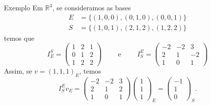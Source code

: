 \documentclass{beamer}
\begin{document}
\begin{darkframes}
\begin{frame}{Exemplo}
  Em ${\mathbb{R}}^3$, se consideramos as bases\vspace*{-0.5cm}
  \begin{align*}
    E &= \{ (1,0,0),(0,1,0),(0,0,1)\}\\
    S &= \{ (1,0,1),(2,1,2),(1,2,2)\}
  \end{align*}
  \vspace*{-0.5cm}temos que
  \begin{equation*}
    I_E^S = \begin{pmatrix} 1 & 2 & 1\\0 & 1 & 2\\1& 2 & 2\end{pmatrix} \qquad \text{ e } \qquad I_S^E = \begin{pmatrix} -2 & -2 & 3\\2 & 1 & -2\\1 & 0 & 1\end{pmatrix}
  \end{equation*}
  Assim, se $v = (1,1,1)_E$, temos
  \begin{equation*}
    I_S^E v_E = \begin{pmatrix} -2 & -2 & 3\\2 & 1 & 2\\1 & 0 & 1\end{pmatrix} \begin{pmatrix} 1\\1\\1\end{pmatrix}_E = \begin{pmatrix} -1\\1\\0\end{pmatrix}_S.
  \end{equation*}
\end{frame}


\end{darkframes}
\end{document}
